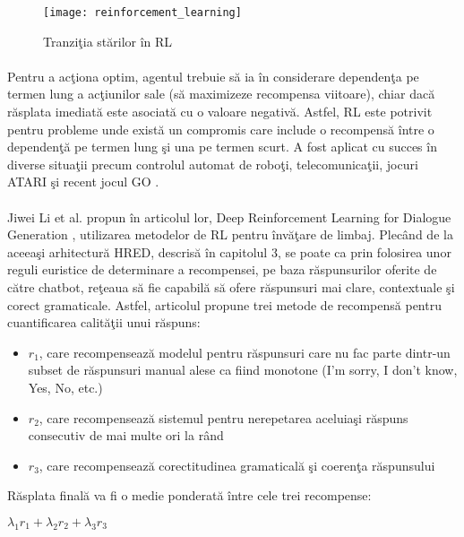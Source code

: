\begin{figure}[H]
\centering
\texttt{[image: reinforcement\_learning]}
\caption{Tranzi\c tia st\u arilor \^ in RL}
\end{figure}

\paragraph{}
Pentru a ac\c tiona optim, agentul trebuie s\u a ia \^ in considerare dependen\c ta pe termen lung a ac\c tiunilor sale (s\u a maximizeze recompensa viitoare), chiar dac\u a r\u asplata imediat\u a este asociat\u a cu o valoare negativ\u a. Astfel, RL este potrivit pentru probleme unde exist\u a un compromis care include o recompens\u a \^ intre o dependen\c t\u a pe termen lung \c si una pe termen scurt. A fost aplicat cu succes \^ in diverse situa\c tii precum controlul automat de robo\c ti, telecomunica\c tii, jocuri ATARI \c si recent jocul GO \cite{silver2016mastering}.

\paragraph{}
Jiwei Li et al. propun \^ in articolul lor, Deep Reinforcement Learning for Dialogue Generation \cite{DBLP:journals/corr/LiMRGGJ16}, utilizarea metodelor de RL pentru \^ inv\u a\c tare de limbaj. Plec\^ and de la aceea\c si arhitectur\u a HRED, descris\u a \^ in capitolul 3, se poate ca prin folosirea unor reguli euristice de determinare a recompensei, pe baza r\u aspunsurilor oferite de c\u atre chatbot, re\c teaua s\u a fie capabil\u a s\u a ofere r\u aspunsuri mai clare, contextuale \c si corect gramaticale. Astfel, articolul propune trei metode de recompens\u a pentru cuantificarea calit\u a\c tii unui r\u aspuns:

\begin{itemize}
	\item \(r_1\), care recompenseaz\u a modelul pentru r\u aspunsuri care nu fac parte dintr-un subset de r\u aspunsuri manual alese ca fiind monotone (I'm sorry, I don't know, Yes, No, etc.)
	\item \(r_2\), care recompenseaz\u a sistemul pentru nerepetarea aceluia\c si r\u aspuns consecutiv de mai multe ori la r\^ and
	\item \(r_3\), care recompenseaz\u a corectitudinea gramatical\u a \c si coeren\c ta r\u aspunsului
\end{itemize}


R\u asplata final\u a va fi o medie ponderat\u a \^ intre cele trei recompense:
\begin{center}
\(\lambda_1 r_1 + \lambda_2 r_2 + \lambda_3 r_3\)
\end{center}

